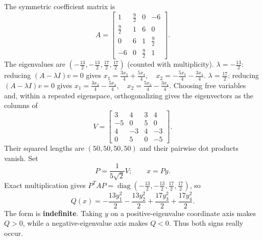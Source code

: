 The symmetric coefficient matrix is
\[
 A=\begin{bmatrix}1&\frac{9}{2}&0&-6\\\frac{9}{2}&1&6&0\\0&6&1&\frac{9}{2}\\-6&0&\frac{9}{2}&1\end{bmatrix}.
\]
The eigenvalues are $(- \frac{13}{2},- \frac{13}{2},\frac{17}{2},\frac{17}{2})$ (counted with multiplicity).
$\lambda=- \frac{13}{2}$: reducing $(A-\lambda I)v=0$ gives
\( x_{1}=\frac{3 x_{3}}{4} + \frac{5 x_{4}}{4},\quad x_{2}=- \frac{5 x_{3}}{4} - \frac{3 x_{4}}{4} \).
$\lambda=\frac{17}{2}$: reducing $(A-\lambda I)v=0$ gives
\( x_{1}=\frac{3 x_{3}}{4} - \frac{5 x_{4}}{4},\quad x_{2}=\frac{5 x_{3}}{4} - \frac{3 x_{4}}{4} \).
Choosing free variables and, within a repeated eigenspace, orthogonalizing
gives the eigenvectors as the columns of
\[
 V=\begin{bmatrix}3&4&3&4\\-5&0&5&0\\4&-3&4&-3\\0&5&0&-5\end{bmatrix}.
\]
Their squared lengths are $(50,50,50,50)$ and their pairwise dot products vanish. Set
\[
 P=\frac1{5 \sqrt{2}}V;\qquad x=Py.
\]
Exact multiplication gives $P^TAP=\operatorname{diag}(- \frac{13}{2},- \frac{13}{2},\frac{17}{2},\frac{17}{2})$, so
\[
 Q(x)=\boxed{- \frac{13 y_{1}^{2}}{2} - \frac{13 y_{2}^{2}}{2} + \frac{17 y_{3}^{2}}{2} + \frac{17 y_{4}^{2}}{2}}.
\]
The form is \textbf{indefinite}. Taking $y$ on a positive-eigenvalue coordinate axis makes $Q>0$,
while a negative-eigenvalue axis makes $Q<0$. Thus both signs really occur.

